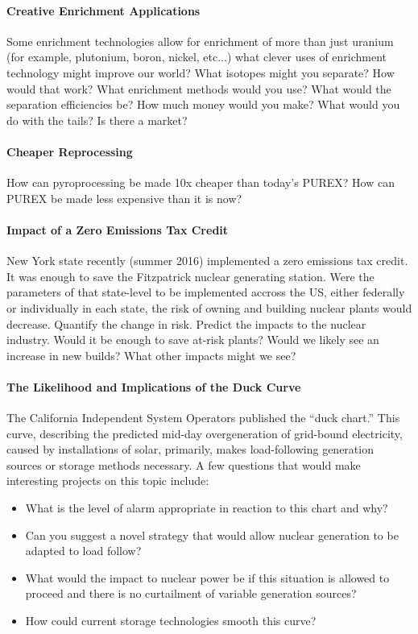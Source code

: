 \documentclass[12pts, answers]{exam}
\begin{document}
\paragraph{Creative Enrichment Applications} Some enrichment technologies allow 
for enrichment of more than just uranium (for example, plutonium, boron, 
nickel, etc...) what clever uses of enrichment technology might improve our 
world? What isotopes might you separate? How would that work? What enrichment 
methods would you use? What would the separation efficiencies be?  How much 
money would you make? What would you do with the tails? Is there a market?

\paragraph{Cheaper Reprocessing} How can pyroprocessing be made 10x cheaper
than today's PUREX? How can PUREX be made less expensive than it is now?
        
\paragraph{Impact of a Zero Emissions Tax Credit} New York state recently
(summer 2016) implemented a zero emissions tax credit. It was enough to save
the Fitzpatrick nuclear generating station. Were the parameters of that
state-level to be implemented accross the US, either federally or individually
in each state, the risk of owning and building nuclear plants would decrease.
Quantify the change in risk. Predict the impacts to the nuclear industry. Would
it be enough to save at-risk plants? Would we likely see an increase in new
builds? What other impacts might we see?

\paragraph{The Likelihood and Implications of the Duck Curve} The California
Independent System Operators published the ``duck chart.'' This curve,
describing the predicted mid-day overgeneration of grid-bound electricity,
caused by installations of solar, primarily, makes load-following generation
sources or storage methods necessary. A few questions that would make
interesting projects on this topic include:
\begin{itemize}
\item What is the level of alarm appropriate in reaction to this chart and why?
\item Can you suggest a novel strategy that would allow nuclear generation to
be adapted to load follow?
\item What would the impact to nuclear power be if this situation is allowed to
proceed and there is no curtailment of variable generation sources?
\item How could current storage technologies smooth this curve?
\end{itemize}
\end{document}
